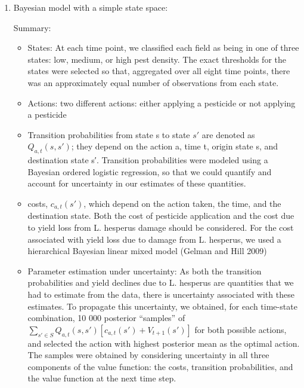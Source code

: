 \documentclass{article}
\theoremstyle{remark}
\theoremstyle{remark}
\theoremstyle{remark}
\theoremstyle{remark}
\theoremstyle{remark}
\theoremstyle{remark}
\begin{document}
\begin{enumerate}
	\item Bayesian model with a simple state space: \cite{Meisner2016}

	Summary:
	\begin{itemize}
		\item States: At each time point, we classified each field as being in one of three states: low, medium, or high pest density. The exact thresholds for the states were selected so that, aggregated over all eight time points, there was an approximately equal number of observations from each state.
		\item Actions: two different actions: either applying a pesticide or not applying a pesticide
		\item Transition probabilities from state s to state $ s'$ are denoted as $Q_{a,t} (s, s')$; they depend on the action a, time t, origin state s, and destination state s′. Transition probabilities were modeled using a Bayesian ordered logistic regression, so that we could quantify and account for uncertainty in our estimates of these quantities.
		\item costs, $c_{a,t} (s′)$, which depend on the action taken, the time, and the destination state. Both the cost of pesticide application and the cost due to yield loss from L. hesperus damage should be considered. For the cost associated with yield loss due to damage from L. hesperus, we used a hierarchical Bayesian linear mixed model (Gelman and Hill 2009)
		\item Parameter estimation under uncertainty: As both the transition probabilities and yield declines due to L. hesperus are quantities that we had to estimate from the data, there is uncertainty associated with these estimates. To propagate this uncertainty, we obtained, for each time-state combination, 10 000 posterior “samples” of $\sum_{ s' \in S} Q_{a,t}(s,s') [c_{a,t}(s')+V_{t+1}(s')]$ for both possible actions, and selected the action with highest posterior mean as the optimal action. The samples were obtained by considering uncertainty in all three components of the value function: the costs, transition probabilities, and the value function at the next time step.
	

\end{itemize}
\end{enumerate}
\end{document}
